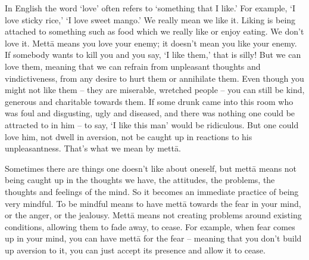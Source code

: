 
In English the word `love' often refers to `something that I like.' For example, `I love sticky rice,' `I love sweet mango.' We really mean we like it. Liking is being attached to something such as food which we really like or enjoy eating. We don't love it. Mettā means you love your enemy; it doesn't mean you like your enemy. If somebody wants to kill you and you say, `I like them,' that is silly! But we can love them, meaning that we can refrain from unpleasant thoughts and vindictiveness, from any desire to hurt them or annihilate them. Even though you might not like them -- they are miserable, wretched people -- you can still be kind, generous and charitable towards them. If some drunk came into this room who was foul and disgusting, ugly and diseased, and there was nothing one could be attracted to in him -- to say, `I like this man' would be ridiculous. But one could love him, not dwell in aversion, not be caught up in reactions to his unpleasantness. That's what we mean by mettā.

Sometimes there are things one doesn't like about oneself, but mettā means not being caught up in the thoughts we have, the attitudes, the problems, the thoughts and feelings of the mind. So it becomes an immediate practice of being very mindful. To be mindful means to have mettā towards the fear in your mind, or the anger, or the jealousy. Mettā means not creating problems around existing conditions, allowing them to fade away, to cease. For example, when fear comes up in your mind, you can have mettā for the fear -- meaning that you don't build up aversion to it, you can just accept its presence and allow it to cease.

